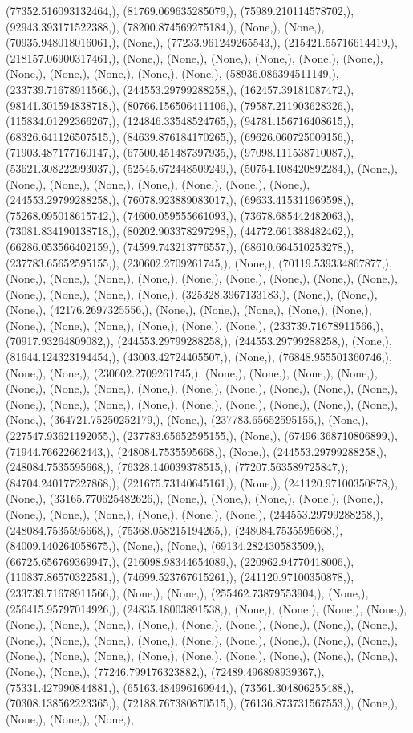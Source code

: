 \documentclass{article}
\begin{document}
(77352.516093132464,), (81769.069635285079,), (75989.210114578702,), (92943.393171522388,), (78200.874569275184,), (None,), (None,), (70935.948018016061,), (None,), (77233.961249265543,), (215421.55716614419,), (218157.06900317461,), (None,), (None,), (None,), (None,), (None,), (None,), (None,), (None,), (None,), (None,), (None,), (58936.086394511149,), (233739.71678911566,), (244553.29799288258,), (162457.39181087472,), (98141.301594838718,), (80766.156506411106,), (79587.211903628326,), (115834.01292366267,), (124846.33548524765,), (94781.156716408615,), (68326.641126507515,), (84639.876184170265,), (69626.060725009156,), (71903.487177160147,), (67500.451487397935,), (97098.111538710087,), (53621.308222993037,), (52545.672448509249,), (50754.108420892284,), (None,), (None,), (None,), (None,), (None,), (None,), (None,), (None,), (244553.29799288258,), (76078.923889083017,), (69633.415311969598,), (75268.095018615742,), (74600.059555661093,), (73678.685442482063,), (73081.834190138718,), (80202.903378297298,), (44772.661388482462,), (66286.053566402159,), (74599.743213776557,), (68610.664510253278,), (237783.65652595155,), (230602.2709261745,), (None,), (70119.539334867877,), (None,), (None,), (None,), (None,), (None,), (None,), (None,), (None,), (None,), (None,), (None,), (None,), (None,), (325328.3967133183,), (None,), (None,), (None,), (42176.2697325556,), (None,), (None,), (None,), (None,), (None,), (None,), (None,), (None,), (None,), (None,), (None,), (233739.71678911566,), (70917.93264809082,), (244553.29799288258,), (244553.29799288258,), (None,), (81644.124323194454,), (43003.42724405507,), (None,), (76848.955501360746,), (None,), (None,), (230602.2709261745,), (None,), (None,), (None,), (None,), (None,), (None,), (None,), (None,), (None,), (None,), (None,), (None,), (None,), (None,), (None,), (None,), (None,), (None,), (None,), (None,), (None,), (None,), (None,), (364721.75250252179,), (None,), (237783.65652595155,), (None,), (227547.93621192055,), (237783.65652595155,), (None,), (67496.368710806899,), (71944.76622662443,), (248084.7535595668,), (None,), (244553.29799288258,), (248084.7535595668,), (76328.140039378515,), (77207.563589725847,), (84704.240177227868,), (221675.73140645161,), (None,), (241120.97100350878,), (None,), (33165.770625482626,), (None,), (None,), (None,), (None,), (None,), (None,), (None,), (None,), (None,), (None,), (None,), (244553.29799288258,), (248084.7535595668,), (75368.058215194265,), (248084.7535595668,), (84009.140264058675,), (None,), (None,), (69134.282430583509,), (66725.656769369947,), (216098.98344654089,), (220962.94770418006,), (110837.86570322581,), (74699.523767615261,), (241120.97100350878,), (233739.71678911566,), (None,), (None,), (255462.73879553904,), (None,), (256415.95797014926,), (24835.18003891538,), (None,), (None,), (None,), (None,), (None,), (None,), (None,), (None,), (None,), (None,), (None,), (None,), (None,), (None,), (None,), (None,), (None,), (None,), (None,), (None,), (None,), (None,), (None,), (None,), (None,), (None,), (None,), (None,), (None,), (None,), (None,), (None,), (None,), (77246.799176323882,), (72489.496898939367,), (75331.427990844881,), (65163.484996169944,), (73561.304806255488,), (70308.138562223365,), (72188.767380870515,), (76136.873731567553,), (None,), (None,), (None,), (None,), 
\end{document}
